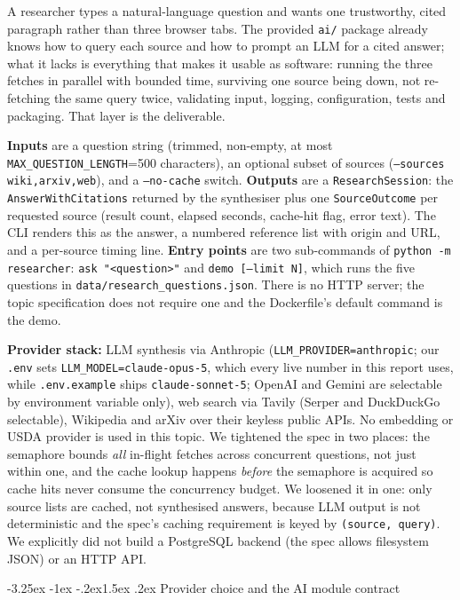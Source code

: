 \documentclass[11pt,a4paper]{article}
\makeatletter
\renewcommand\subsection{\@startsection{subsection}{2}{\z@}%
    {-3.25ex \@plus -1ex \@minus -.2ex}{1.5ex \@plus .2ex}%
    {\normalfont\large\bfseries\color{accent}}}%
\makeatother
\begin{document}
A researcher types a natural-language question and wants one trustworthy, cited paragraph rather than three browser tabs. The provided \texttt{ai/} package already knows how to query each source and how to prompt an LLM for a cited answer; what it lacks is everything that makes it usable as software: running the three fetches in parallel with bounded time, surviving one source being down, not re-fetching the same query twice, validating input, logging, configuration, tests and packaging. That layer is the deliverable.

\textbf{Inputs} are a question string (trimmed, non-empty, at most \texttt{MAX\_QUESTION\_LENGTH}=500 characters), an optional subset of sources (\texttt{--sources wiki,arxiv,web}), and a \texttt{--no-cache} switch. \textbf{Outputs} are a \texttt{ResearchSession}: the \texttt{AnswerWithCitations} returned by the synthesiser plus one \texttt{SourceOutcome} per requested source (result count, elapsed seconds, cache-hit flag, error text). The CLI renders this as the answer, a numbered reference list with origin and URL, and a per-source timing line. \textbf{Entry points} are two sub-commands of \texttt{python -m researcher}: \texttt{ask "<question>"} and \texttt{demo [--limit N]}, which runs the five questions in \texttt{data/research\_questions.json}. There is no HTTP server; the topic specification does not require one and the Dockerfile's default command is the demo.

\textbf{Provider stack:} LLM synthesis via Anthropic (\texttt{LLM\_PROVIDER=anthropic}; our \texttt{.env} sets \texttt{LLM\_MODEL=claude-opus-5}, which every live number in this report uses, while \texttt{.env.example} ships \texttt{claude-sonnet-5}; OpenAI and Gemini are selectable by environment variable only), web search via Tavily (Serper and DuckDuckGo selectable), Wikipedia and arXiv over their keyless public APIs. No embedding or USDA provider is used in this topic. We tightened the spec in two places: the semaphore bounds \emph{all} in-flight fetches across concurrent questions, not just within one, and the cache lookup happens \emph{before} the semaphore is acquired so cache hits never consume the concurrency budget. We loosened it in one: only source lists are cached, not synthesised answers, because LLM output is not deterministic and the spec's caching requirement is keyed by \texttt{(source, query)}. We explicitly did not build a PostgreSQL backend (the spec allows filesystem JSON) or an HTTP API.

\subsection{Provider choice and the AI module contract}
\end{document}
